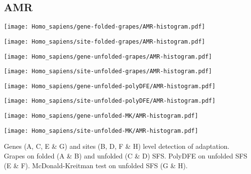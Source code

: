 \documentclass{article}
\begin{document}
\pagebreak
\subsection{AMR}
\centering
\begin{minipage}{0.49\linewidth}
    \texttt{[image: Homo\_sapiens/gene-folded-grapes/AMR-histogram.pdf]}
\end{minipage}%
\hfill
\begin{minipage}{0.49\linewidth}
    \texttt{[image: Homo\_sapiens/site-folded-grapes/AMR-histogram.pdf]}
\end{minipage}
\hfill
\begin{minipage}{0.49\linewidth}
    \texttt{[image: Homo\_sapiens/gene-unfolded-grapes/AMR-histogram.pdf]}
\end{minipage}%
\hfill
\begin{minipage}{0.49\linewidth}
    \texttt{[image: Homo\_sapiens/site-unfolded-grapes/AMR-histogram.pdf]}
\end{minipage}
\hfill
\begin{minipage}{0.49\linewidth}
    \texttt{[image: Homo\_sapiens/gene-unfolded-polyDFE/AMR-histogram.pdf]}
\end{minipage}%
\hfill
\begin{minipage}{0.49\linewidth}
    \texttt{[image: Homo\_sapiens/site-unfolded-polyDFE/AMR-histogram.pdf]}
\end{minipage}
\hfill
\begin{minipage}{0.49\linewidth}
    \texttt{[image: Homo\_sapiens/gene-unfolded-MK/AMR-histogram.pdf]}
\end{minipage}%
\hfill
\begin{minipage}{0.49\linewidth}
    \texttt{[image: Homo\_sapiens/site-unfolded-MK/AMR-histogram.pdf]}
\end{minipage}
\hfill
\flushleft
Genes (A, C, E \& G) and sites (B, D, F \& H) level detection of adaptation.
Grapes on folded (A \& B) and unfolded (C \& D) SFS.
PolyDFE on unfolded SFS (E \& F).
McDonald-Kreitman test on unfolded SFS (G \& H).
\end{document}
